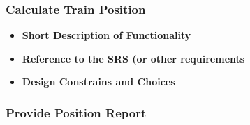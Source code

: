 \subsubsection{Calculate Train Position}

\begin{itemize}
\item \textbf{Short Description of Functionality}\\
\item \textbf{Reference to the SRS (or other requirements}\\
\item \textbf{Design Constrains and Choices}\\
\end{itemize}

\subsubsection{Provide Position Report}\label{sss:provposrep}

